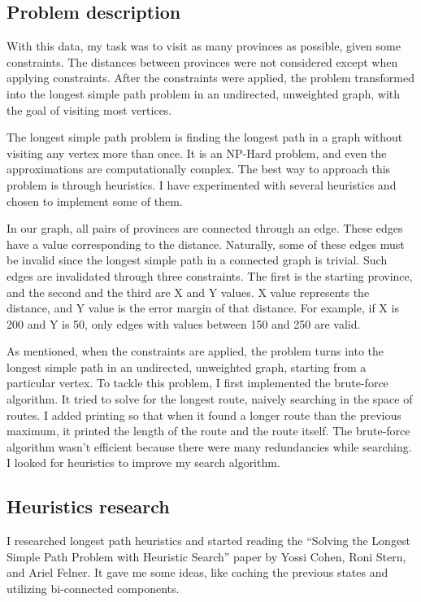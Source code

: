 \documentclass[12pt,a4paper]{article}
\begin{document}
\subsection{Problem description}

With this data, my task was to visit as many provinces as possible, given some
constraints. The distances between provinces were not considered except when
applying constraints. After the constraints were applied, the problem
transformed into the longest simple path problem in an undirected, unweighted
graph, with the goal of visiting most vertices.

The longest simple path problem is finding the longest path in a graph without
visiting any vertex more than once. It is an NP-Hard problem, and even the
approximations are computationally complex. The best way to approach this
problem is through heuristics. I have experimented with several heuristics and
chosen to implement some of them.

In our graph, all pairs of provinces are connected through an edge. These edges
have a value corresponding to the distance. Naturally, some of these edges must
be invalid since the longest simple path in a connected graph is trivial. Such
edges are invalidated through three constraints. The first is the starting
province, and the second and the third are X and Y values. X value represents
the distance, and Y value is the error margin of that distance. For example, if
X is 200 and Y is 50, only edges with values between 150 and 250 are valid.

As mentioned, when the constraints are applied, the problem turns into the
longest simple path in an undirected, unweighted graph, starting from a
particular vertex. To tackle this problem, I first implemented the brute-force
algorithm. It tried to solve for the longest route, naively searching in the
space of routes. I added printing so that when it found a longer route than the
previous maximum, it printed the length of the route and the route itself. The
brute-force algorithm wasn't efficient because there were many redundancies
while searching. I looked for heuristics to improve my search algorithm.

\subsection{Heuristics research}

I researched longest path heuristics and started reading the ``Solving the
Longest Simple Path Problem with Heuristic Search'' paper by Yossi Cohen, Roni
Stern, and Ariel Felner. It gave me some ideas, like caching the previous states
and utilizing bi-connected components.
\end{document}

